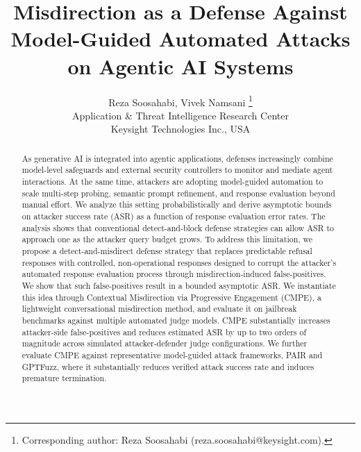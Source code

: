 \documentclass[conference,compsoc]{IEEEtran}
\begin{document}
    \title{Misdirection as a Defense Against Model-Guided Automated Attacks on Agentic AI Systems}

    \author{
        Reza Soosahabi, Vivek Namsani \thanks{Corresponding author: Reza Soosahabi (reza.soosahabi@keysight.com).}\\
        Application \& Threat Intelligence Research Center\\
        Keysight Technologies Inc., USA \\
    }


    \maketitle
    \thispagestyle{plain}\pagestyle{plain}


\begin{abstract}
 As generative AI is integrated into agentic applications, defenses increasingly combine model-level safeguards and external security controllers to monitor and mediate agent interactions.
 At the same time, attackers are adopting model-guided automation to scale multi-step probing, semantic prompt refinement, and response evaluation beyond manual effort.
 We analyze this setting probabilistically and derive asymptotic bounds on attacker success rate (ASR) as a function of response evaluation error rates.
 The analysis shows that conventional detect-and-block defense strategies can allow ASR to approach one as the attacker query budget grows.
 To address this limitation, we propose a detect-and-misdirect defense strategy that replaces predictable refusal responses with controlled, non-operational responses designed to corrupt the attacker’s automated response evaluation process through misdirection-induced false-positives.
We show that such false-positives result in a bounded asymptotic ASR.
 We instantiate this idea through Contextual Misdirection via Progressive Engagement (CMPE), a lightweight conversational misdirection method, and evaluate it on jailbreak benchmarks against multiple automated judge models.
 CMPE substantially increases attacker-side false-positives and reduces estimated ASR by up to two orders of magnitude across simulated attacker-defender judge configurations.
 We further evaluate CMPE against representative model-guided attack frameworks, PAIR and GPTFuzz, where it substantially reduces verified attack success rate and induces premature termination.
\end{abstract}
\end{document}
